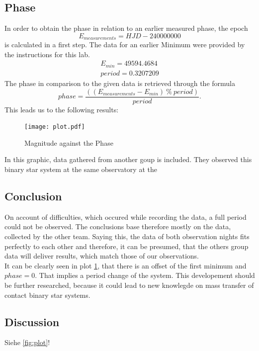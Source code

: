 \subsection{Phase}
  \label{sec:again}
  In order to obtain the phase in relation to an earlier measured phase, the epoch 
  \begin{equation*}
    E_{measurements} = HJD - 240000000
  \end{equation*}
  is calculated in a first step. The data for an earlier Minimum were provided by the 
  instructions for this lab. 
  \begin{align*}
    E_{min} = 49594.4684\\
    period = 0.3207209
  \end{align*}
  The phase in comparison to the given data is retrieved through the formula
  \begin{equation}
    phase = \dfrac{((E_{measurements}-E_{min})\ \% \ period)}{period}.
  \end{equation}
  This leads us to the following results:
  \begin{figure}[H]
    \centering
    \texttt{[image: plot.pdf]}
    \caption{Magnitude against the Phase}
    \label{fig:phase}
  \end{figure}
  In this graphic, data gathered from another goup is included. %
  They observed this binary star system at the same observatory at the %

\subsection{Conclusion}
  \label{sec:fuckoff}
  On account of difficulties, which occured while recording the data, a full period could not
  be observed. The conclusions base therefore mostly on the data, collected by the other team.
  Saying this, the data of both observation nights fits perfectly to each other and therefore, 
  it can be presumed, that the others group data will deliver results, which match those of our 
  observations.\\
  It can be clearly seen in plot \ref{fig:phase}, that there is an offset of the first minimum 
  and $phase = 0$. That implies a period change of the system. This developement should be 
  further researched, because it could lead to new knowlegde on mass transfer of contact binary
  star systems.

\subsection{Discussion}
  \label{sec:orange}




Siehe \autoref{fig:plot}!
